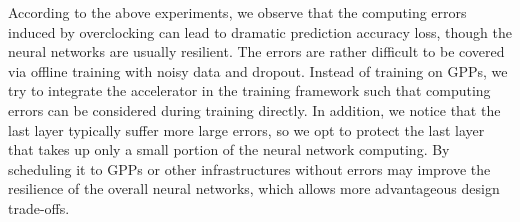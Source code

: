 According to the above experiments, we observe that the computing errors induced by 
overclocking can lead to dramatic prediction accuracy loss, though 
the neural networks are usually resilient. The errors are rather difficult to be
covered via offline training with noisy data and dropout. 
Instead of training on GPPs, we try to integrate the accelerator in the training framework 
such that computing errors can be considered during training directly. In addition, we notice 
that the last layer typically suffer more large errors, so we opt to protect the last layer 
that takes up only a small portion of the neural network computing. By scheduling it to GPPs 
or other infrastructures without errors may improve the resilience of the overall neural 
networks, which allows more advantageous design trade-offs.

